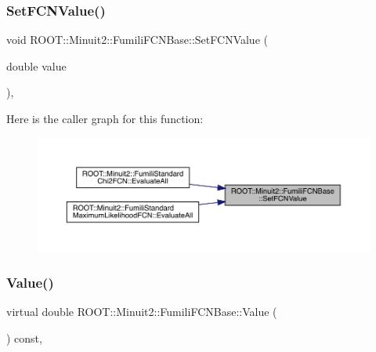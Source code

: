 \mbox{\label{classROOT_1_1Minuit2_1_1FumiliFCNBase_a537ad24d5584bd089c14ee92567ddd72}} 
\subsubsection{\texorpdfstring{SetFCNValue()}{SetFCNValue()}\hspace{0.1cm}{\footnotesize\ttfamily [3/3]}}
{\footnotesize\ttfamily void R\+O\+O\+T\+::\+Minuit2\+::\+Fumili\+F\+C\+N\+Base\+::\+Set\+F\+C\+N\+Value (\begin{DoxyParamCaption}\item[{double}]{value }\end{DoxyParamCaption})\hspace{0.3cm}{\ttfamily [inline]}, {\ttfamily [protected]}}

Here is the caller graph for this function\+:
\nopagebreak
\begin{figure}[H]
\begin{center}
\leavevmode
\includegraphics[width=350pt]{de/dc5/classROOT_1_1Minuit2_1_1FumiliFCNBase_a537ad24d5584bd089c14ee92567ddd72_icgraph}
\end{center}
\end{figure}
\mbox{\label{classROOT_1_1Minuit2_1_1FumiliFCNBase_a221dacee0ccde747a271a0cecd759f98}} 
\subsubsection{\texorpdfstring{Value()}{Value()}\hspace{0.1cm}{\footnotesize\ttfamily [1/3]}}
{\footnotesize\ttfamily virtual double R\+O\+O\+T\+::\+Minuit2\+::\+Fumili\+F\+C\+N\+Base\+::\+Value (\begin{DoxyParamCaption}{ }\end{DoxyParamCaption}) const\hspace{0.3cm}{\ttfamily [inline]}, {\ttfamily [virtual]}}


